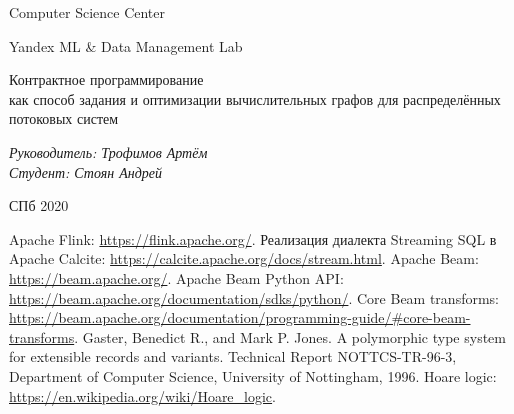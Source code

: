 \documentclass[a4paper,12pt]{article}
\begin{document}
\thispagestyle{empty}
\begin{center}
    Computer Science Center

    Yandex ML \& Data Management Lab
\end{center}
\vspace{13ex}

\begin{center}
    \vspace{16ex}
    \begin{spacing}{1.5}
        {\Large Контрактное программирование \\как способ задания и оптимизации вычислительных графов для распределённых потоковых систем}
    \end{spacing}
\end{center}
\vfill
\begin{flushright}
    \noindent
    \textit{Руководитель: Трофимов Артём} \\
    \textit{Студент: Стоян Андрей}
\end{flushright}
\vspace{5ex}
\begin{center}
    СПб 2020
\end{center}
\newpage

\tableofcontents
\newpage


\newpage

\newpage

\newpage

\newpage





\begin{thebibliography}{9}
     Apache Flink: \url{https://flink.apache.org/}.
     Реализация диалекта Streaming SQL в Apache Calcite: \url{https://calcite.apache.org/docs/stream.html}.
     Apache Beam: \url{https://beam.apache.org/}.
     Apache Beam Python API: \url{https://beam.apache.org/documentation/sdks/python/}.
     Core Beam transforms: \url{https://beam.apache.org/documentation/programming-guide/#core-beam-transforms}.
     Gaster, Benedict R., and Mark P. Jones. A polymorphic type system for extensible records and variants. Technical Report NOTTCS-TR-96-3, Department of Computer Science, University of Nottingham, 1996.
     Hoare logic: \url{https://en.wikipedia.org/wiki/Hoare_logic}.
\end{thebibliography}
\end{document}
